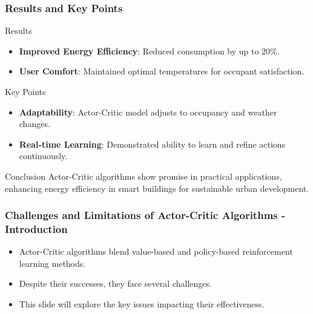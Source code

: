\documentclass[aspectratio=169]{beamer}
\begin{document}
\begin{frame}[fragile]
    \frametitle{Results and Key Points}
    \begin{block}{Results}
        \begin{itemize}
            \item \textbf{Improved Energy Efficiency}: Reduced consumption by up to 20\%.
            \item \textbf{User Comfort}: Maintained optimal temperatures for occupant satisfaction.
        \end{itemize}
    \end{block}
    
    \begin{block}{Key Points}
        \begin{itemize}
            \item \textbf{Adaptability}: Actor-Critic model adjusts to occupancy and weather changes.
            \item \textbf{Real-time Learning}: Demonstrated ability to learn and refine actions continuously.
        \end{itemize}
    \end{block}
    
    \begin{block}{Conclusion}
        Actor-Critic algorithms show promise in practical applications, enhancing energy efficiency in smart buildings for sustainable urban development.
    \end{block}
\end{frame}

\begin{frame}[fragile]
    \frametitle{Challenges and Limitations of Actor-Critic Algorithms - Introduction}
    
    \begin{itemize}
        \item Actor-Critic algorithms blend value-based and policy-based reinforcement learning methods.
        \item Despite their successes, they face several challenges.
        \item This slide will explore the key issues impacting their effectiveness.
    \end{itemize}
    
\end{frame}
\end{document}
